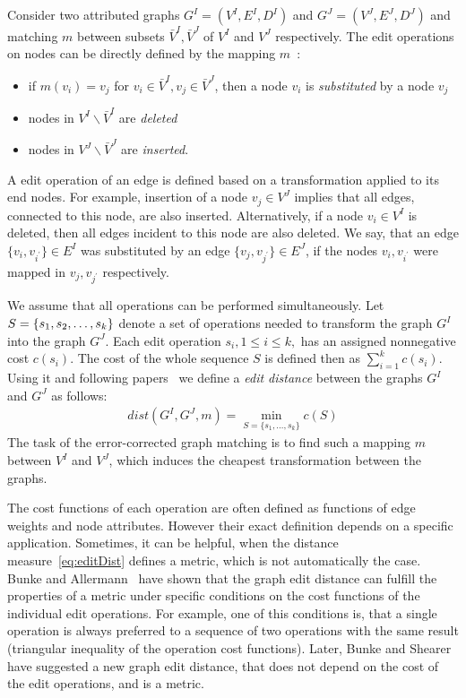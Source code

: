 Consider two attributed graphs $G^I = (V^I, E^I,D^I)$ and $G^J = (V^J, E^J,D^J)$ and matching $m$ between subsets $\bar{V}^I,\bar{V}^J$ of $V^I$ and $V^J$ respectively. The edit operations on nodes can be directly defined by the mapping $m$~\cite{Bunke1998_ErrTolerantGM}:
\begin{itemize}
	\item if $m(v_i)=v_j$ for $v_i\in\bar{V}^I,v_j\in\bar{V}^J$, then a node $v_i$ is \emph{substituted} by a node $v_j$
	\item nodes in $V^I\backslash\bar{V}^I$ are \emph{deleted}
	\item nodes in $V^J\backslash\bar{V}^J$ are \emph{inserted}.
\end{itemize}
A edit operation of an edge is defined based on a transformation applied to its end nodes. For example, insertion of a node $v_j\in V^J$ implies that all edges, connected to this node, are also inserted. Alternatively, if a node $v_i\in V^I$ is deleted, then all edges incident to this node are also deleted. We say, that an edge $\{v_i,v_{i^\prime}\}\in E^I$ was substituted by an edge $\{v_j,v_{j^\prime}\}\in E^J$, if the nodes $v_i,v_{i^\prime}$ were mapped in $v_j,v_{j^\prime}$ respectively.

We assume that all operations can be performed simultaneously. Let $S=\{s_1,s_2,\dots,\newline s_k\}$ denote a set of operations needed to transform the graph $G^I$ into the graph $G^J$. 
Each edit operation $s_i, 1\le i\le k,$ has an assigned nonnegative cost $c(s_i)$. The cost of the whole sequence $S$ is defined then as $\sum_{i=1}^{k}c(s_i)$. Using it and following papers~\cite{Bunke1983_inexactGM, Wang1995} we define a \emph{edit distance} between the graphs $G^I$ and $G^J$ as follows:
\begin{eqnarray} \label{eq:editDist}
dist(G^I,G^J,m) = \min\limits_{S=\{s_1,\dots,s_k\}}c(S)
\end{eqnarray}
The task of the error-corrected graph matching is to find such a mapping $m$ between $V^I$ and $V^J$, which induces the cheapest transformation between the graphs.

The cost functions of each operation are often defined as functions of edge weights and node attributes. However their exact definition depends on a specific application. Sometimes, it can be helpful, when the distance measure~\eqref{eq:editDist} defines a metric, which is not automatically the case. Bunke and Allermann~\cite{Bunke1983_inexactGM} have shown that the graph edit distance can fulfill the properties of a metric under specific conditions on the cost functions of the individual edit operations. For example, one of this conditions is, that a single operation is always preferred to a sequence of two operations with the same result (triangular inequality of the operation cost functions). Later, Bunke and Shearer~\cite{Bunke1998_graphDist} have suggested a new graph edit distance, that does not depend on the cost of the edit operations, and is a metric.

